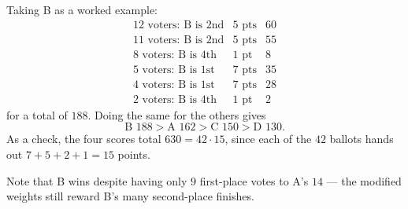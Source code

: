 \documentclass[12pt]{ximera}
\begin{document}
\begin{problem}
\begin{prompt}
\begin{feedback}
Taking B as a worked example:
\[
\begin{array}{lll}
\text{12 voters: B is 2nd} & 5\text{ pts} & 60\\
\text{11 voters: B is 2nd} & 5\text{ pts} & 55\\
\text{8 voters: B is 4th}  & 1\text{ pt}  & 8\\
\text{5 voters: B is 1st}  & 7\text{ pts} & 35\\
\text{4 voters: B is 1st}  & 7\text{ pts} & 28\\
\text{2 voters: B is 4th}  & 1\text{ pt}  & 2
\end{array}
\]
for a total of $188$. Doing the same for the others gives
\[ \text{B } 188 > \text{A } 162 > \text{C } 150 > \text{D } 130. \]
As a check, the four scores total $630 = 42\cdot 15$, since each of the $42$ ballots
hands out $7+5+2+1=15$ points.

Note that B wins despite having only $9$ first-place votes to A's $14$ --- the modified
weights still reward B's many second-place finishes.
\end{feedback}
\end{prompt}
\end{problem}
\end{document}
